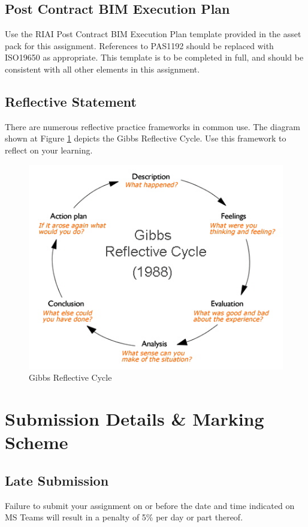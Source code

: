 \subsection{Post Contract BIM Execution Plan}\label{sect:BEP}

Use the RIAI Post Contract BIM Execution Plan template provided in the asset pack for this assignment.  References to PAS1192 should be replaced with ISO19650 as appropriate.  This template is to be completed in full, and should be consistent with all other elements in this assignment. 


\subsection{Reflective Statement}\label{sect:ReflectiveStatement} 

There are numerous reflective practice frameworks in common use.  The diagram shown at Figure \ref{fig:gibbs-diagram} depicts the Gibbs Reflective Cycle.  Use this framework to reflect on your learning.


\begin{figure}[h!]
	\centering
	\includegraphics[width=0.7\linewidth]{img/gibbs-diagram}
	\caption{Gibbs Reflective Cycle}
	\label{fig:gibbs-diagram}
\end{figure}



\newpage
\section{Submission Details \& Marking Scheme}


\subsection{Late Submission}
Failure to submit your assignment on or before the date and time indicated on MS Teams will result in a penalty of 5\% per day or part thereof.

